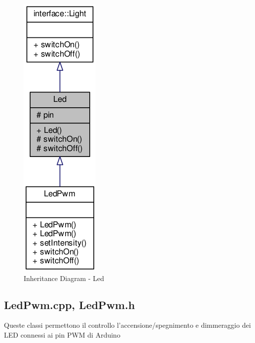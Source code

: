 \begin{figure}[!ht]
	\centering
	\includegraphics[scale=.5]{img/UML/InheritanceDiagram/Led.png}
	\caption{Inheritance Diagram - Led}
\end{figure}

\newpage
\subsection{LedPwm.cpp, LedPwm.h}
Queste classi permettono il controllo l'accensione/spegnimento e dimmeraggio dei LED connessi ai pin PWM di Arduino
